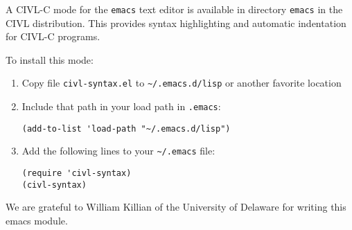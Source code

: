 A CIVL-C mode for the \texttt{emacs} text editor is available in
directory \texttt{emacs} in the CIVL distribution.  This provides
syntax highlighting and automatic indentation for CIVL-C programs.

To install this mode:
\begin{enumerate}
\item Copy file \texttt{civl-syntax.el} to \verb!~/.emacs.d/lisp! or another favorite location
\item Include that path in your load path in \verb!.emacs!:
\begin{verbatim}
(add-to-list 'load-path "~/.emacs.d/lisp")
\end{verbatim}
\item Add the following lines to your \verb!~/.emacs! file:
\begin{verbatim}
(require 'civl-syntax)
(civl-syntax)
\end{verbatim}
\end{enumerate}

We are grateful to William Killian of the University of Delaware for
writing this emacs module.

